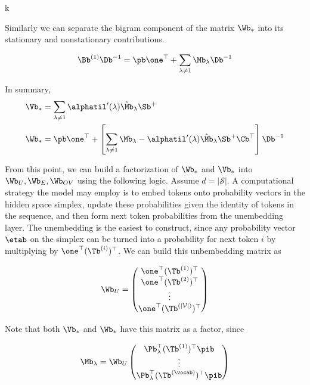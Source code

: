 k\documentclass{article}
\begin{document}
Similarly we can separate the bigram component of the matrix $\Wb_*$ into its stationary and nonstationary contributions. 

\begin{equation}
    \Bb^{(1)}\Db^{-1} = \pb \one^\top + \sum_{\lambda\neq1}\Mb_\lambda\Db^{-1}
\end{equation}

In summary, 
\begin{align}
    \Vb_* &= \sum_{\lambda\neq 1} \alphatil'(\lambda) \hat{\Mb}_\lambda \Sb^+ \\
    \Wb_* &= \pb\one^\top + \left[\sum_{\lambda \neq 1} \Mb_\lambda - \alphatil'(\lambda) \hat{\Mb}_\lambda \Sb^{+}\Cb^\top\right] \Db^{-1}
\end{align}

From this point, we can build a factorization of $\Wb_*$ and $\Vb_*$ into $\Wb_U, \Wb_E, \Wb_{OV}$ using the following logic. Assume $d = |\mathcal{S}|$. A computational strategy the model may employ is to embed tokens onto probability vectors in the hidden space simplex, update these probabilities given the identity of tokens in the sequence, and then form next token probabilities from the unembedding layer. The unembedding is the easiest to construct, since any probability vector $\etab$ on the simplex can be turned into a probability for next token $i$ by multiplying by $\one^\top (\Tb^{(i)})^\top$. We can build this unbembedding matrix as 

\begin{equation}\label{unembedding}
    \Wb_U = \begin{pmatrix}
        \one^\top (\Tb^{(1)})^\top \\
        \one^\top (\Tb^{(2)})^\top \\
        \vdots\\
        \one^\top (\Tb^{(|\mathcal{V}|)})^\top
    \end{pmatrix}
\end{equation}

Note that both $\Vb_*$ and $\Wb_*$ have this matrix as a factor, since

\begin{equation}
    \Mb_\lambda = \Wb_U \begin{pmatrix}
        \Pb_\lambda^\top (\Tb^{(1)})^\top\pib \\
        \vdots \\
        \Pb_\lambda^\top (\Tb^{(\vocab)})^\top\pib
    \end{pmatrix}
\end{equation}
\end{document}
